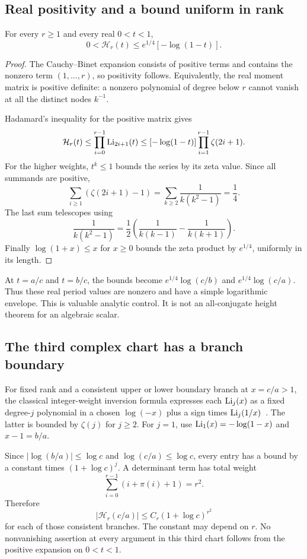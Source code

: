 
\subsection{Real positivity and a bound uniform in rank}
\begin{theorem}\label{thm:hankel-real}
For every $r\ge1$ and every real $0<t<1$,
\[
 0<\mathcal H_r(t)\le e^{1/4}[-\log(1-t)].
\]
\end{theorem}
\begin{proof}
The Cauchy--Binet expansion consists of positive terms and contains the nonzero term $(1,\ldots,r)$, so positivity follows. Equivalently, the real moment matrix is positive definite: a nonzero polynomial of degree below $r$ cannot vanish at all the distinct nodes $k^{-1}$.

Hadamard's inequality for the positive matrix gives
\[
 \mathcal H_r(t)\le\prod_{i=0}^{r-1}\operatorname{Li}_{2i+1}(t)
 \le[-\log(1-t)]\prod_{i=1}^{r-1}\zeta(2i+1).
\]
For the higher weights, $t^k\le1$ bounds the series by its zeta value. Since all summands are positive,
\[
 \sum_{i\ge1}(\zeta(2i+1)-1)
 =\sum_{k\ge2}\frac1{k(k^2-1)}=\frac14.
\]
The last sum telescopes using
\[
 \frac1{k(k^2-1)}=\frac12\left(\frac1{k(k-1)}-\frac1{k(k+1)}\right).
\]
Finally $\log(1+x)\le x$ for $x\ge0$ bounds the zeta product by $e^{1/4}$, uniformly in its length.
\end{proof}
At $t=a/c$ and $t=b/c$, the bounds become $e^{1/4}\log(c/b)$ and $e^{1/4}\log(c/a)$. Thus these real period values are nonzero and have a simple logarithmic envelope. This is valuable analytic control. It is not an all-conjugate height theorem for an algebraic scalar.

\subsection{The third complex chart has a branch boundary}
For fixed rank and a consistent upper or lower boundary branch at $x=c/a>1$, the classical integer-weight inversion formula expresses each $\operatorname{Li}_j(x)$ as a fixed degree-$j$ polynomial in a chosen $\log(-x)$ plus a sign times $\operatorname{Li}_j(1/x)$~\cite{DLMFPolylog}. The latter is bounded by $\zeta(j)$ for $j\ge2$. For $j=1$, use $\operatorname{Li}_1(x)=-\log(1-x)$ and $x-1=b/a$.

Since $|\log(b/a)|\le\log c$ and $\log(c/a)\le\log c$, every entry has a bound by a constant times $(1+\log c)^j$. A determinant term has total weight
\[
 \sum_{i=0}^{r-1}(i+\pi(i)+1)=r^2.
\]
Therefore
\[
 |\mathcal H_r(c/a)|\le C_r(1+\log c)^{r^2}
\]
for each of those consistent branches. The constant may depend on $r$. No nonvanishing assertion at every argument in this third chart follows from the positive expansion on $0<t<1$.
